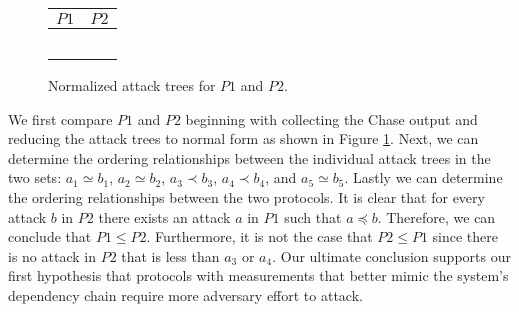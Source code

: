 \documentclass[runningheads]{llncs}
\theoremstyle{definition}
\begin{document}
\begin{figure}[h]
    \begin{center}
        \begin{tabular}{ M{6cm} | M{6cm} }
                $P1$ & $P2$ \\
                \hline
                &\\ 
                 \hspace{.03cm}  
                &  \hspace{.03cm}  \\ 
                &\\
                 \hspace{.03cm}  
                &    \\
                 
                 &  \\ 
            \end{tabular}
    \end{center}
    \caption{Normalized attack trees for $P1$ and $P2$.}
    \label{fig:rtm-compare-reduced}
\end{figure}

We first compare $P1$ and $P2$ beginning with
collecting the Chase output and reducing the attack trees to normal
form as shown in Figure \ref{fig:rtm-compare-reduced}. Next, we can
determine the ordering relationships between the individual attack
trees in the two sets: $a_1 \simeq b_1$, $a_2 \simeq b_2$,
$a_3 \prec b_3$, $a_4 \prec b_4$, and $a_5 \simeq b_5$. Lastly we can
determine the ordering relationships between the two protocols. It is
clear that for every attack $b$ in $P2$ there exists an attack
$a$ in $P1$ such that $a \preceq b$. Therefore, we can conclude that
$P1 \leq P2$. Furthermore, it is not the case that $P2 \leq P1$ since
there is no attack in $P2$ that is less than $a_3$ or $a_4$. Our
ultimate conclusion supports our first hypothesis that protocols 
with measurements that better mimic the system's dependency chain 
require more adversary effort to attack.
\end{document}
